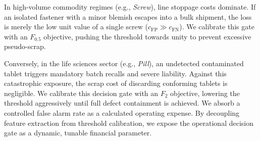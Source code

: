 In high-volume commodity regimes (e.g., \emph{Screw}), line stoppage costs dominate. If an isolated fastener with a minor blemish escapes into a bulk shipment, the loss is merely the low unit value of a single screw ($c_{\mathrm{FP}} \gg c_{\mathrm{FN}}$). We calibrate this gate with an $F_{0.5}$ objective, pushing the threshold towards unity to prevent excessive pseudo-scrap. 

Conversely, in the life sciences sector (e.g., \emph{Pill}), an undetected contaminated tablet triggers mandatory batch recalls and severe liability. Against this catastrophic exposure, the scrap cost of discarding conforming tablets is negligible. We calibrate this decision gate with an $F_2$ objective, lowering the threshold aggressively until full defect containment is achieved. We absorb a controlled false alarm rate as a calculated operating expense. By decoupling feature extraction from threshold calibration, we expose the operational decision gate as a dynamic, tunable financial parameter.
